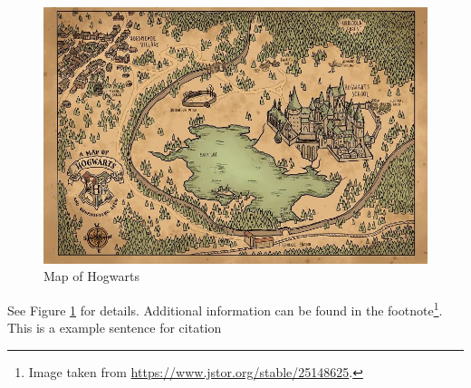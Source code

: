 \begin{figure}[htbp]
    \centering
    \includegraphics[width=.9\linewidth]{./figures/hogwarts_map.jpg}
    \caption{Map of Hogwarts}
    \label{figure:hogwarts_map}
\end{figure}
See Figure \ref{figure:hogwarts_map} for details. Additional information can be
found in the footnote\footnote{Image taken from \url{https://www.jstor.org/stable/25148625}.}. \\

This is a example sentence for citation \cite{hevner04_desig_scien_infor_system_resear}

